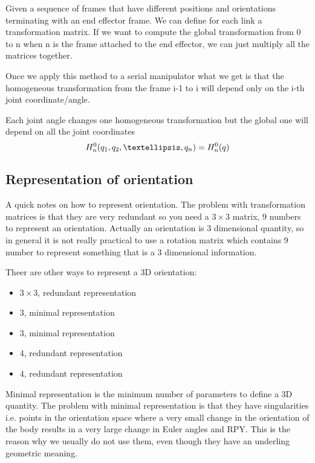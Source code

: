 Given a sequence of frames that have different positions and orientations terminating with an end effector frame. We can define for each link a transformation matrix. If we want to compute the global transformation from 0 to n when n is the frame attached to the end effector, we can just multiply all the matrices together.

Once we apply this method to a serial manipulator what we get is that the homogeneous transformation from the frame i-1 to i will depend only on the i-th joint coordinate/angle.

Each joint angle changes one homogeneous transformation but the global one will depend on all the joint coordinates 
\[H_n^0(q_1, q_2,\textellipsis, q_n) = H_n^0(q)\]

\subsection{Representation of orientation}
A quick notes on how to represent orientation.
The problem with transformation matrices is that they are very redundant so you need a $3\times 3$ matrix, 9 numbers to represent an orientation.
Actually an orientation is 3 dimensional quantity, so in general it is not really practical to use a rotation matrix which contains 9 number to represent something that is a 3 dimensional information.

Theer are other ways to represent a 3D orientation:
\begin{itemize}
\item{ $3\times3$, redundant representation}
\item{ $3$, minimal representation}
\item{  $3$, minimal representation}
\item{ $4$, redundant representation}
\item{ $4$, redundant representation}
\end{itemize}

Minimal representation is the minimum number of parameters to define a 3D quantity. The problem with minimal representation is that they have singularities i.e. points in the orientation space where a very small change in the orientation of the body results in a very large change in Euler angles and RPY. This is the reason why we usually do not use them, even though they have an underling geometric meaning.

